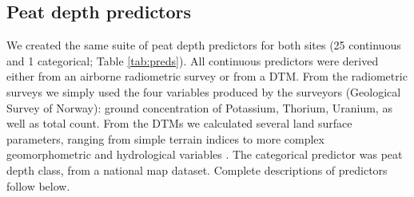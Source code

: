 \documentclass[soil, manuscript]{copernicus}
\begin{document}
\subsection{Peat depth predictors}

We created the same suite of peat depth predictors for both sites (25 continuous and 1 categorical; Table \ref{tab:preds}).
All continuous predictors were derived either from an airborne radiometric survey or from a DTM.
From the radiometric surveys we simply used the four variables produced by the surveyors (Geological Survey of Norway): ground concentration of Potassium, Thorium, Uranium, as well as total count.
From the DTMs we calculated several land surface parameters, ranging from simple terrain indices to more complex geomorphometric and hydrological variables \citep{maxwellLandsurfaceParametersSpatial2022}.
The categorical predictor was peat depth class, from a national map dataset.
Complete descriptions of predictors follow below.
\end{document}
